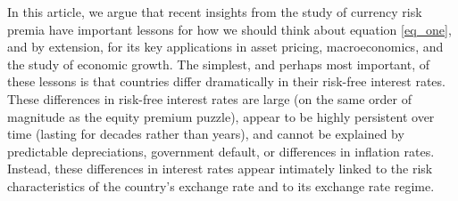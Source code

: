 \documentclass[11pt]{article}
\begin{document}
In this article, we argue that recent insights from the study of currency risk premia have important lessons for how we should think about equation \ref{eq_one}, and by extension, for its key applications in asset pricing, macroeconomics, and the study of economic growth. The simplest, and perhaps most important, of these lessons is that countries differ dramatically in their risk-free interest rates. These differences in risk-free interest rates are large (on the same order of magnitude as the equity premium puzzle), appear to be highly persistent over time (lasting for decades rather than years), and cannot be explained by predictable depreciations, government default, or differences in inflation rates. Instead, these differences in interest rates appear intimately linked to the risk characteristics of the country's exchange rate and to its exchange rate regime.
\end{document}
